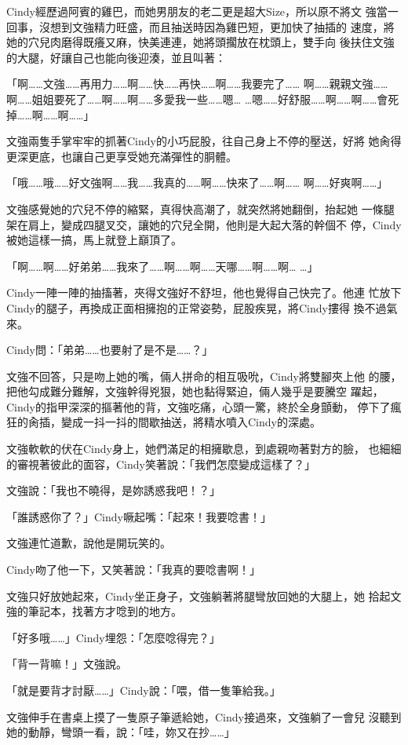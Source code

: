 Cindy經歷過阿賓的雞巴，而她男朋友的老二更是超大Size，所以原不將文
強當一回事，沒想到文強精力旺盛，而且抽送時因為雞巴短，更加快了抽插的
速度，將她的穴兒肉磨得既癢又麻，快美連連，她將頭擱放在枕頭上，雙手向
後扶住文強的大腿，好讓自己也能向後迎湊，並且叫著：

「啊……文強……再用力……啊……快……再快……啊……我要完了……
啊……親親文強……啊……姐姐要死了……啊……啊……多愛我一些……嗯…
…嗯……好舒服……啊……啊……會死掉……啊……啊……」

文強兩隻手掌牢牢的抓著Cindy的小巧屁股，往自己身上不停的壓送，好將
她肏得更深更底，也讓自己更享受她充滿彈性的胴體。

「哦……哦……好文強啊……我……我真的……啊……快來了……啊……
啊……好爽啊……」

文強感覺她的穴兒不停的縮緊，真得快高潮了，就突然將她翻倒，抬起她
一條腿架在肩上，變成四腿叉交，讓她的穴兒全開，他則是大起大落的幹個不
停，Cindy被她這樣一搞，馬上就登上巔頂了。

「啊……啊……好弟弟……我來了……啊……啊……天哪……啊……啊…
…」

Cindy一陣一陣的抽搐著，夾得文強好不舒坦，他也覺得自己快完了。他連
忙放下Cindy的腿子，再換成正面相擁抱的正常姿勢，屁股疾晃，將Cindy摟得
換不過氣來。

Cindy問：「弟弟……也要射了是不是……？」

文強不回答，只是吻上她的嘴，倆人拼命的相互吸吮，Cindy將雙腳夾上他
的腰，把他勾成難分難解，文強幹得兇狠，她也黏得緊迫，倆人幾乎是要騰空
躍起，Cindy的指甲深深的摳著他的背，文強吃痛，心頭一驚，終於全身顫動，
停下了瘋狂的肏插，變成一抖一抖的間歇抽送，將精水噴入Cindy的深處。

文強軟軟的伏在Cindy身上，她們滿足的相擁歇息，到處親吻著對方的臉，
也細細的審視著彼此的面容，Cindy笑著說：「我們怎麼變成這樣了？」

文強說：「我也不曉得，是妳誘惑我吧！？」

「誰誘惑你了？」Cindy噘起嘴：「起來！我要唸書！」

文強連忙道歉，說他是開玩笑的。

Cindy吻了他一下，又笑著說：「我真的要唸書啊！」

文強只好放她起來，Cindy坐正身子，文強躺著將腿彎放回她的大腿上，她
拾起文強的筆記本，找著方才唸到的地方。

「好多哦……」Cindy埋怨：「怎麼唸得完？」

「背一背嘛！」文強說。

「就是要背才討厭……」Cindy說：「喂，借一隻筆給我。」

文強伸手在書桌上摸了一隻原子筆遞給她，Cindy接過來，文強躺了一會兒
沒聽到她的動靜，彎頭一看，說：「哇，妳又在抄……」

